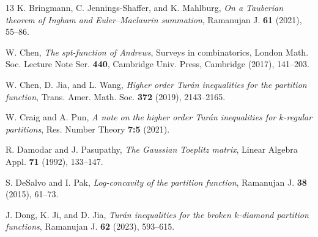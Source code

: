 \documentclass[11pt,reqno,a4paper]{amsart}
\renewcommand{\(}{\left\(}
\renewcommand{\)}{\right\)}
\numberwithin{equation}{section}
\theoremstyle{plain}
\theoremstyle{definition} %
\numberwithin{equation}{section}
\begin{document}
\begin{thebibliography}{13}
		  K. Bringmann, C. Jennings-Shaffer, and K. Mahlburg, {\it On a Tauberian theorem of Ingham and Euler--Maclaurin summation}, Ramanujan J. {\bf 61} (2021), 55--86.


		
		 W. Chen, {\it The spt-function of Andrews}, Surveys in combinatorics, London Math. Soc. Lecture Note Ser. {\bf 440}, Cambridge Univ. Press, Cambridge (2017), 141--203.
		
		 W. Chen, D. Jia, and L. Wang, {\it Higher order Tur\'{a}n inequalities for the partition function}, Trans. Amer. Math. Soc. {\bf 372} (2019), 2143--2165.
		
		
		
	
		
		
		
		 W. Craig and A. Pun, {\it A note on the higher order Tur\'{a}n inequalities for $k$-regular partitions}, Res. Number Theory {\bf 7:5} (2021).

		
		 R. Damodar and J. Pasupathy, {\it The Gaussian Toeplitz matrix}, Linear Algebra Appl. {\bf 71} (1992), 133--147.

		 S. DeSalvo and I. Pak, {\it Log-concavity of the partition function}, Ramanujan J. \textbf{38} (2015), 61--73.
		
	
		
		 J. Dong, K. Ji, and D. Jia, {\it Tur\'{a}n inequalities for the broken $k$-diamond partition functions}, Ramanujan J. {\bf 62} (2023), 593--615.


\end{thebibliography}
\end{document}
